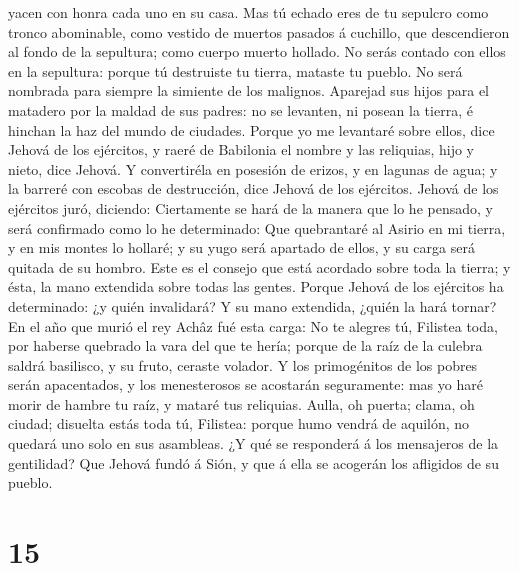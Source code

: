 yacen con honra cada uno en su casa.  Mas tú echado eres de
tu sepulcro como tronco abominable, como vestido de muertos pasados á
cuchillo, que descendieron al fondo de la sepultura; como cuerpo muerto
hollado.  No serás contado con ellos en la sepultura:
porque tú destruiste tu tierra, mataste tu pueblo. No será nombrada para
siempre la simiente de los malignos.  Aparejad sus hijos
para el matadero por la maldad de sus padres: no se levanten, ni posean
la tierra, é hinchan la haz del mundo de ciudades.  Porque
yo me levantaré sobre ellos, dice Jehová de los ejércitos, y raeré de
Babilonia el nombre y las reliquias, hijo y nieto, dice Jehová.
 Y convertiréla en posesión de erizos, y en lagunas de
agua; y la barreré con escobas de destrucción, dice Jehová de los
ejércitos.  Jehová de los ejércitos juró, diciendo:
Ciertamente se hará de la manera que lo he pensado, y será confirmado
como lo he determinado:  Que quebrantaré al Asirio en mi
tierra, y en mis montes lo hollaré; y su yugo será apartado de ellos, y
su carga será quitada de su hombro.  Este es el consejo que
está acordado sobre toda la tierra; y ésta, la mano extendida sobre
todas las gentes.  Porque Jehová de los ejércitos ha
determinado: ¿y quién invalidará? Y su mano extendida, ¿quién la hará
tornar?  En el año que murió el rey Achâz fué esta carga:
 No te alegres tú, Filistea toda, por haberse quebrado la
vara del que te hería; porque de la raíz de la culebra saldrá basilisco,
y su fruto, ceraste volador.  Y los primogénitos de los
pobres serán apacentados, y los menesterosos se acostarán seguramente:
mas yo haré morir de hambre tu raíz, y mataré tus reliquias.
 Aulla, oh puerta; clama, oh ciudad; disuelta estás toda
tú, Filistea: porque humo vendrá de aquilón, no quedará uno solo en sus
asambleas.  ¿Y qué se responderá á los mensajeros de la
gentilidad? Que Jehová fundó á Sión, y que á ella se acogerán los
afligidos de su pueblo.

\hypertarget{section-14}{%
\section{15}\label{section-14}}

